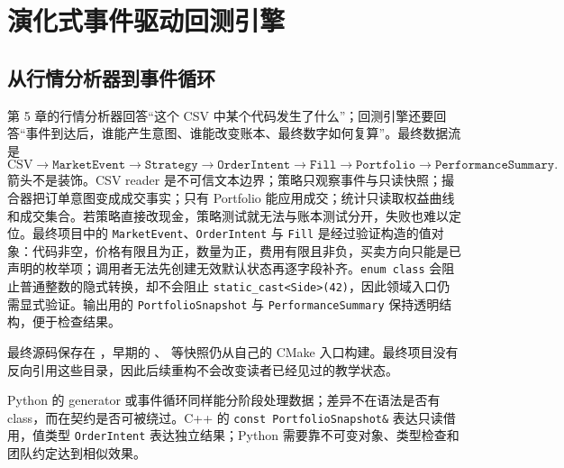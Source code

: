 \chapter{演化式事件驱动回测引擎}


\section{从行情分析器到事件循环}

第 5 章的行情分析器回答“这个 CSV 中某个代码发生了什么”；回测引擎还要回答“事件到达后，谁能产生意图、谁能改变账本、最终数字如何复算”。最终数据流是
\[
\text{CSV}\rightarrow\texttt{MarketEvent}\rightarrow\texttt{Strategy}
\rightarrow\texttt{OrderIntent}\rightarrow\texttt{Fill}
\rightarrow\texttt{Portfolio}\rightarrow\texttt{PerformanceSummary}.
\]
箭头不是装饰。CSV reader 是不可信文本边界；策略只观察事件与只读快照；撮合器把订单意图变成成交事实；只有 Portfolio 能应用成交；统计只读取权益曲线和成交集合。若策略直接改现金，策略测试就无法与账本测试分开，失败也难以定位。最终项目中的 \texttt{MarketEvent}、\texttt{OrderIntent} 与 \texttt{Fill} 是经过验证构造的值对象：代码非空，价格有限且为正，数量为正，费用有限且非负，买卖方向只能是已声明的枚举项；调用者无法先创建无效默认状态再逐字段补齐。\texttt{enum class} 会阻止普通整数的隐式转换，却不会阻止 \texttt{static\_cast<Side>(42)}，因此领域入口仍需显式验证。输出用的 \texttt{PortfolioSnapshot} 与 \texttt{PerformanceSummary} 保持透明结构，便于检查结果。

最终源码保存在 ，早期的 、 等快照仍从自己的 CMake 入口构建。最终项目没有反向引用这些目录，因此后续重构不会改变读者已经见过的教学状态。

\begin{pythonbridge}
Python 的 generator 或事件循环同样能分阶段处理数据；差异不在语法是否有 class，而在契约是否可被绕过。C++ 的 \texttt{const PortfolioSnapshot\&} 表达只读借用，值类型 \texttt{OrderIntent} 表达独立结果；Python 需要靠不可变对象、类型检查和团队约定达到相似效果。

\end{pythonbridge}

